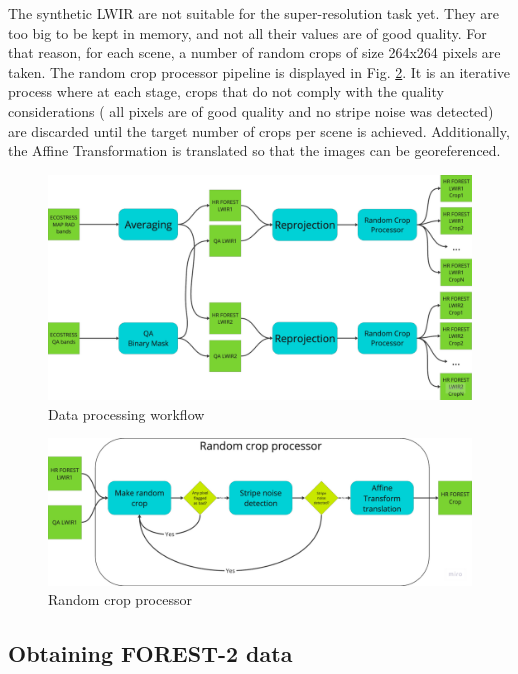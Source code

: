 The synthetic LWIR are not suitable for the super-resolution task yet.
They are too big to be kept in memory, and not all their values are of good quality.
For that reason, for each scene, a number of random crops of size 264x264 pixels are taken.
The random crop processor pipeline is displayed in Fig. \ref{fig:5-random_crop_processor}.
It is an iterative process where at each stage, crops that do not comply with the quality considerations ( all pixels are of good quality and no stripe noise was detected) are discarded until the target number of crops per scene is achieved.
Additionally, the Affine Transformation is translated so that the images can be georeferenced.


\begin{figure}[H]
    \centering
    \includegraphics[width=\linewidth]{Includes/5-data_processing_flow_chart.pdf}
    \caption{Data processing workflow}
    \label{fig:5-data_processing_flow_chart}
\end{figure}

\begin{figure}[H]
    \centering
    \includegraphics[width=\linewidth]{Includes/5-random_crop_processor.pdf}
    \caption{Random crop processor}
    \label{fig:5-random_crop_processor}
\end{figure}



\subsection{Obtaining FOREST-2 data}

